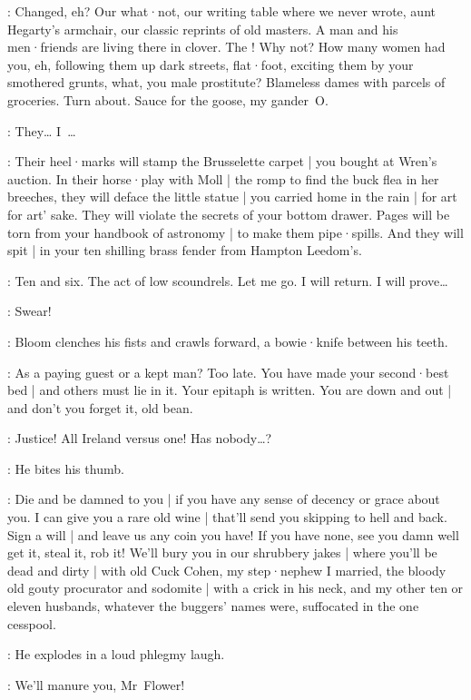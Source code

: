 \Bello:
Changed,
eh?
Our what·not,
our writing table where we never wrote,
aunt Hegarty's armchair,
our classic reprints of old masters.
A man and his men·friends are living there in clover.
The !
Why not?
How many women had you,
eh,
following them up dark streets,
flat·foot,
exciting them by your smothered grunts,
what,
you male prostitute?
Blameless dames with parcels of groceries.
Turn about.
Sauce for the goose,
my gander~O\@.

\Bloom:
They… I~…

\Bello:
Their heel·marks will stamp the Brusselette carpet |
you bought at Wren's auction.
In their horse·play with Moll |
the romp to find the buck flea in her breeches,
they will deface the little statue |
you carried home in the rain |
for art for art' sake.
They will violate the secrets of your bottom drawer.
Pages will be torn from your handbook of astronomy |
to make them pipe·spills.
And they will spit |
in your ten shilling brass fender from Hampton Leedom's.

\Bloom:
Ten and six.
The act of low scoundrels.
Let me go.
I will return.
I will prove…

\Voice:
Swear!

:
Bloom clenches his fists and crawls forward,
a bowie·knife between his teeth.

\Bello:
As a paying guest or a kept man?
Too late.
You have made your second·best bed |
and others must lie in it.
Your epitaph is written.
You are down and out |
and don't you forget it,
old bean.%

\Bloom:
Justice!
All Ireland versus one!
Has nobody…?

:
He bites his thumb.

\Bello:
Die and be damned to you |
if you have any sense of decency or grace about you.
I can give you a rare old wine |
that'll send you skipping to hell and back.
Sign a will |
and leave us any coin you have!
If you have none,
see you damn well get it,
steal it,
rob it!
We'll bury you in our shrubbery jakes |
where you'll be dead and dirty  |
with old Cuck Cohen,
my step·nephew I married,
the bloody old gouty procurator and sodomite |
with a crick in his neck,
and my other ten or eleven husbands,
%
whatever the buggers' names were,
suffocated in the one cesspool.

:
He explodes in a loud phlegmy laugh.

\Bello:
We'll manure you,
Mr~Flower!

